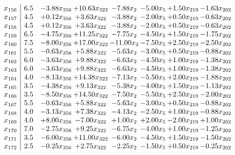 \documentclass[8pt]{article}
\begin{document}
\[\begin{array}{c| c c@{\hskip 2pt} c@{\hskip 2pt} c@{\hskip 2pt} c@{\hskip 2pt} c@{\hskip 2pt} c@{\hskip 2pt} }
 x_{156}   &  6.5 & -3.88 x_{356} & + 10.63 x_{322} & -7.88 x_{2} & -5.00 x_{5} & +  1.50 x_{219} & -1.63 x_{202}\\
 x_{157}   &  4.5 & +  0.12 x_{356} & +  3.63 x_{322} & -3.88 x_{2} & -2.00 x_{5} & +  0.50 x_{219} & -0.63 x_{202}\\
 x_{158}   &  4.5 & +  0.12 x_{356} & +  3.63 x_{322} & -3.88 x_{2} & -2.00 x_{5} & +  0.50 x_{219} & -0.63 x_{202}\\
 x_{159}   &  6.5 & -4.75 x_{356} & + 11.25 x_{322} & -7.75 x_{2} & -4.50 x_{5} & +  1.50 x_{219} & -1.75 x_{202}\\
 x_{160}   &  7.5 & -8.00 x_{356} & + 17.00 x_{322} & -11.00 x_{2} & -7.50 x_{5} & +  2.50 x_{219} & -2.50 x_{202}\\
 x_{161}   &  5.5 & -0.63 x_{356} & +  5.88 x_{322} & -5.63 x_{2} & -3.00 x_{5} & +  0.50 x_{219} & -0.88 x_{202}\\
 x_{162}   &  6.0 & -3.63 x_{356} & +  9.88 x_{322} & -6.63 x_{2} & -4.50 x_{5} & +  1.00 x_{219} & -1.38 x_{202}\\
 x_{163}   &  6.0 & -3.63 x_{356} & +  9.88 x_{322} & -6.63 x_{2} & -4.50 x_{5} & +  1.00 x_{219} & -1.38 x_{202}\\
 x_{164}   &  4.0 & -8.13 x_{356} & + 14.38 x_{322} & -7.13 x_{2} & -5.50 x_{5} & +  2.00 x_{219} & -1.88 x_{202}\\
 x_{165}   &  3.5 & -4.38 x_{356} & +  9.13 x_{322} & -5.38 x_{2} & -4.00 x_{5} & +  1.50 x_{219} & -1.13 x_{202}\\
 x_{166}   &  3.5 & -8.50 x_{356} & + 14.50 x_{322} & -7.50 x_{2} & -5.50 x_{5} & +  2.50 x_{219} & -2.00 x_{202}\\
 x_{167}   &  5.5 & -0.63 x_{356} & +  5.88 x_{322} & -5.63 x_{2} & -3.00 x_{5} & +  0.50 x_{219} & -0.88 x_{202}\\
 x_{168}   &  4.0 & -3.13 x_{356} & +  7.38 x_{322} & -4.13 x_{2} & -2.50 x_{5} & +  1.00 x_{219} & -0.88 x_{202}\\
 x_{169}   &  4.0 & +  8.00 x_{356} & -7.00 x_{322} & +  1.00 x_{2} & +  2.00 x_{5} & -2.00 x_{219} & +  1.00 x_{202}\\
 x_{170}   &  7.0 & -2.75 x_{356} & +  9.25 x_{322} & -6.75 x_{2} & -4.00 x_{5} & +  1.00 x_{219} & -1.25 x_{202}\\
 x_{171}   &  3.5 & -6.00 x_{356} & + 11.00 x_{322} & -6.00 x_{2} & -4.50 x_{5} & +  1.50 x_{219} & -1.50 x_{202}\\
 x_{172}   &  2.5 & -0.25 x_{356} & +  2.75 x_{322} & -2.25 x_{2} & -1.50 x_{5} & +  0.50 x_{219} & -0.25 x_{202}\\

\end{array}\]
\end{document}
